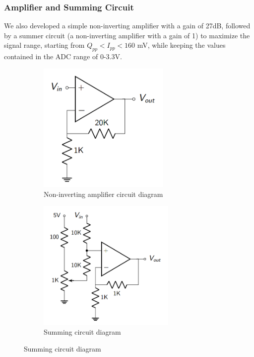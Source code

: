 \documentclass[12pt]{article}
\begin{document}
\subsubsection{Amplifier and Summing Circuit}
We also developed a simple non-inverting amplifier with a gain of 27dB, followed by a summer circuit (a non-inverting amplifier with a gain of 1) to maximize the signal range, starting from $Q_{pp} < I_{pp} < 160$ mV, while keeping the values contained in the ADC range of 0-3.3V. 
\begin{figure}[H]
\centering
\begin{subfigure}{0.48\textwidth}
\centering
        \includegraphics[width=0.7\textwidth]{amp.PNG}
        \caption{Non-inverting amplifier circuit diagram}
        \label{amp}
    \end{subfigure}
\begin{subfigure}{0.48\textwidth}
\centering
        \includegraphics[width=0.73\textwidth]{summing.PNG}
        \caption{Summing circuit diagram}
        \label{summing}
        \end{subfigure}
    \end{figure}
\end{document}
